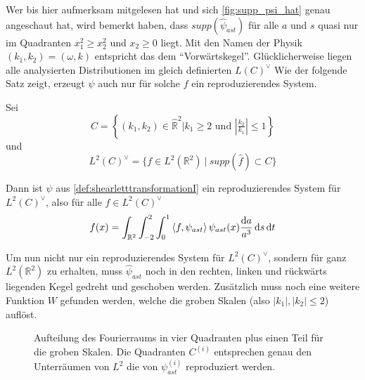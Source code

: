 Wer bis hier aufmerksam mitgelesen hat und sich \cref{fig:supp_psi_hat} genau angeschaut hat, wird bemerkt haben, dass $supp(\hat\psi_{ast})$ für alle $a$ und $s$ quasi nur im Quadranten $x_1^2 \geq x_2^2$ und $x_2 \geq 0$ liegt.
Mit den Namen der Physik $(k_1, k_2) = (\omega, k)$ entspricht das dem "`Vorwärtskegel"'. Glücklicherweise liegen alle analysierten Distributionen im gleich definierten $L(C)^\vee$
Wie der folgende Satz zeigt, erzeugt $\psi$ auch nur für solche $f$ ein reproduzierendes System.

\begin{theorem}
\label{thm:shearlets_reproduzieren}
    Sei
    \begin{equation*}
        C= \left\{(k_1,k_2)\in \hat{\mathbb{R}}^2
        \Big| k_1 \geq 2 \textrm{ und } \left\lvert\tfrac{k_2}{k_1}\right\rvert \leq 1
        \right\}
    \end{equation*}
    und
    \begin{equation}
        L^2(C)^\vee = \{f \in L^2(\mathbb{R}^2) ~|~ supp (\hat f) \subset C\}
        \label{eq:L2_cone}
    \end{equation}

    Dann ist $\psi$ aus \cref{def:shearletttransformationI} ein reproduzierendes System für $L^2(C)^\vee$, also für alle
    $f \in L^2(C)^\vee$
    \begin{equation}
        f(x) = \int_{\mathbb{R}^2} \int_{-2}^2 \int_0^1
                \left\langle f,\psi_{ast}\right\rangle \psi_{ast}(x)
                \frac{\mathop{}\!\mathrm{d} a}{a^3} \mathop{}\!\mathrm{d} s \mathop{}\!\mathrm{d} t
    \end{equation}
\end{theorem}

Um nun nicht nur ein reproduzierendes System für $L^2(C)^\vee$, sondern für ganz $L^2(\mathbb{R}^2)$ zu erhalten, muss $\hat \psi_{ast}$ noch in den rechten, linken und rückwärts liegenden Kegel gedreht und geschoben werden. Zusätzlich muss noch eine weitere Funktion $W$ gefunden werden, welche die groben Skalen (also $|k_1|, |k_2| \leq 2$) auflöst.

\begin{figure}[h]
\centering

\caption{Aufteilung des Fourierraums in vier Quadranten plus einen Teil für die groben Skalen. Die Quadranten $C^{(i)}$ entsprechen genau den Unterräumen von $L^2$ die von $\psi_{ast}^{(i)}$ reproduziert werden.}
\label{fig:quadrants}
\end{figure}

